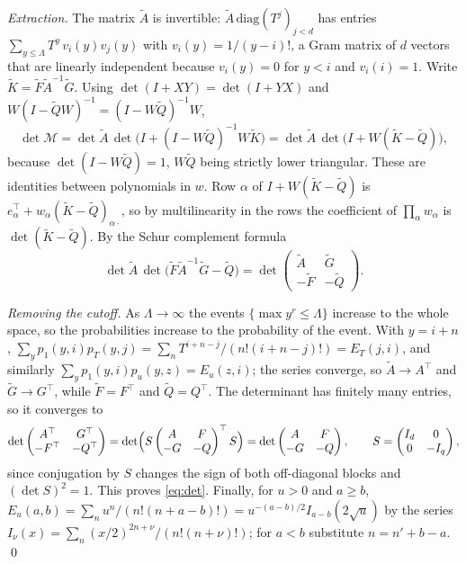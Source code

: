\documentclass[11pt]{amsart}
\theoremstyle{remark}
\numberwithin{equation}{section}
\begin{document}
\emph{Extraction.} The matrix $\tilde A$ is invertible: $\tilde A\,\mathrm{diag}(T^{j})_{j<d}$ has entries $\sum_{y\le\Lambda}T^y\,v_i(y)v_j(y)$ with $v_i(y)=1/(y-i)!$, a Gram matrix of $d$ vectors that are linearly independent because $v_i(y)=0$ for $y<i$ and $v_i(i)=1$. Write $\tilde K=\tilde F\tilde A^{-1}\tilde G$. Using $\det(I+XY)=\det(I+YX)$ and $W(I-\tilde QW)^{-1}=(I-W\tilde Q)^{-1}W$,
\[
\det\mathcal M=\det\tilde A\,\det\bigl(I+(I-W\tilde Q)^{-1}W\tilde K\bigr)=\det\tilde A\,\det\bigl(I+W(\tilde K-\tilde Q)\bigr),
\]
because $\det(I-W\tilde Q)=1$, $W\tilde Q$ being strictly lower triangular. These are identities between polynomials in $w$. Row $\alpha$ of $I+W(\tilde K-\tilde Q)$ is $e_\alpha^{\top}+w_\alpha(\tilde K-\tilde Q)_{\alpha\cdot}$, so by multilinearity in the rows the coefficient of $\prod_\alpha w_\alpha$ is $\det(\tilde K-\tilde Q)$. By the Schur complement formula
\[
\det\tilde A\,\det\bigl(\tilde F\tilde A^{-1}\tilde G-\tilde Q\bigr)=\det\begin{pmatrix}\tilde A&\tilde G\\-\tilde F&-\tilde Q\end{pmatrix}.
\]

\emph{Removing the cutoff.} As $\Lambda\to\infty$ the events $\{\max y^r\le\Lambda\}$ increase to the whole space, so the probabilities increase to the probability of the event. With $y=i+n$, $\sum_yp_1(y,i)p_T(y,j)=\sum_{n}T^{i+n-j}/(n!(i+n-j)!)=E_T(j,i)$, and similarly $\sum_yp_1(y,i)p_{u}(y,z)=E_u(z,i)$; the series converge, so $\tilde A\to A^{\top}$ and $\tilde G\to G^{\top}$, while $\tilde F=F^{\top}$ and $\tilde Q=Q^{\top}$. The determinant has finitely many entries, so it converges to
\[
\det\begin{pmatrix}A^{\top}&G^{\top}\\-F^{\top}&-Q^{\top}\end{pmatrix}=\det\Bigl(S\begin{pmatrix}A&F\\-G&-Q\end{pmatrix}^{\top}S\Bigr)=\det\begin{pmatrix}A&F\\-G&-Q\end{pmatrix},\qquad S=\begin{pmatrix}I_d&0\\0&-I_q\end{pmatrix},
\]
since conjugation by $S$ changes the sign of both off-diagonal blocks and $(\det S)^2=1$.
This proves \eqref{eq:det}. Finally, for $u>0$ and $a\ge b$, $E_u(a,b)=\sum_nu^n/(n!(n+a-b)!)=u^{-(a-b)/2}I_{a-b}(2\sqrt u)$ by the series $I_\nu(x)=\sum_n(x/2)^{2n+\nu}/(n!(n+\nu)!)$; for $a<b$ substitute $n=n'+b-a$. \qed
\end{document}
